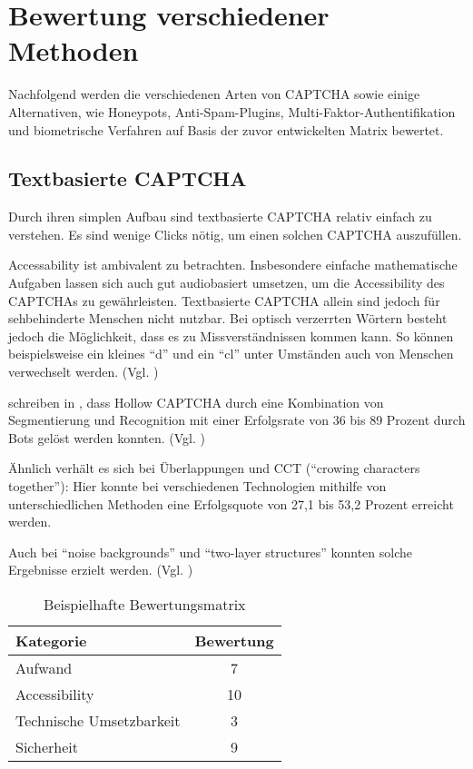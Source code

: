 \chapter{Bewertung verschiedener Methoden}

Nachfolgend werden die verschiedenen Arten von CAPTCHA sowie einige Alternativen, wie Honeypots, Anti-Spam-Plugins, 
Multi-Faktor-Authentifikation und biometrische Verfahren auf Basis der zuvor entwickelten Matrix bewertet. 

\section{Textbasierte CAPTCHA}

Durch ihren simplen Aufbau sind textbasierte CAPTCHA relativ einfach zu verstehen.
Es sind wenige Clicks nötig, um einen solchen CAPTCHA auszufüllen. 

Accessability ist ambivalent zu betrachten.
Insbesondere einfache mathematische Aufgaben lassen sich auch gut audiobasiert umsetzen, 
um die Accessibility des CAPTCHAs zu gewährleisten.
Textbasierte CAPTCHA allein sind jedoch für sehbehinderte Menschen nicht nutzbar.
Bei optisch verzerrten Wörtern besteht jedoch die Möglichkeit, dass es zu Missverständnissen kommen kann.
So können beispielsweise ein kleines ``d'' und ein ``cl'' unter Umständen auch von Menschen verwechselt werden. (Vgl. \cite[p.3]{usabilityofcaptchas})

\citeauthor{surveyofresearch} schreiben in \cite[p.xx]{surveyofresearch}, 
dass Hollow CAPTCHA durch eine Kombination von Segmentierung und Recognition %
mit einer Erfolgsrate von 36 bis 89 Prozent durch Bots gelöst werden konnten. (Vgl. \cite{gao}) %

Ähnlich verhält es sich bei Überlappungen und CCT (``crowing characters together''):
Hier konnte bei verschiedenen Technologien mithilfe von unterschiedlichen Methoden
eine Erfolgsquote von 27,1 bis 53,2 Prozent erreicht werden. \cite[p.xx]{surveyofresearch} %

Auch bei ``noise backgrounds'' und ``two-layer structures'' konnten solche Ergebnisse erzielt werden. 
(Vgl. \cite[p.xx]{surveyofresearch} \cite{gao})


\begin{table}[h!]
    \caption{Beispielhafte Bewertungsmatrix}
    \begin{center}
        \begin{tabular}{l|c}
            Kategorie                       & Bewertung \\\hline
            Aufwand                         & 7         \\
            Accessibility                   & 10        \\
            Technische Umsetzbarkeit        & 3         \\
            Sicherheit                      & 9         
        \end{tabular}
    \end{center}
\end{table}

